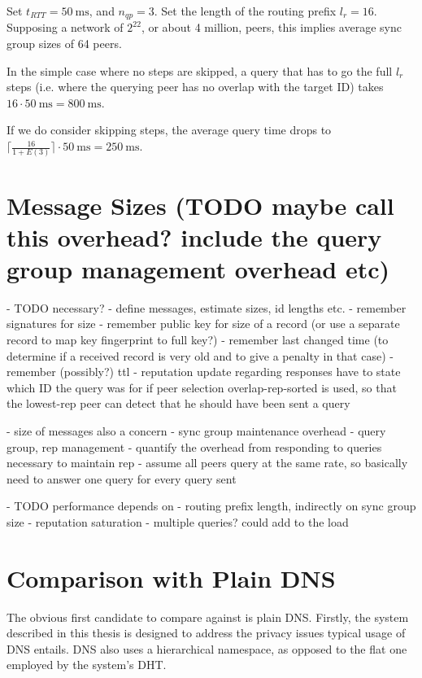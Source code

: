 Set $t_{RTT} = \SI{50}{\milli\second}$, and $n_{qp} = 3$. Set the length of the
routing prefix $l_r = 16$. Supposing a network of $2^{22}$, or about 4 million,
peers, this implies average sync group sizes of 64 peers.

In the simple case where no steps are skipped, a query that has to go the full
$l_r$ steps (i.e. where the querying peer has no overlap with the target ID)
takes $16 \cdot \SI{50}{\milli\second} = \SI{800}{\milli\second}$.

If we do consider skipping steps, the average query time drops to
$\lceil\frac{16}{1 + E(3)}\rceil \cdot \SI{50}{\milli\second} =
\SI{250}{\milli\second}$.

\section{Message Sizes (TODO maybe call this overhead? include the query group
management overhead etc)}
- TODO necessary?
- define messages, estimate sizes, id lengths etc.
    - remember signatures for size
    - remember public key for size of a record (or use a separate record to map
      key fingerprint to full key?)
    - remember last changed time (to determine if a received record is very old
      and to give a penalty in that case)
    - remember (possibly?) ttl
    - reputation update regarding responses have to state which ID the query was
      for if peer selection overlap-rep-sorted is used, so that the lowest-rep
      peer can detect that he should have been sent a query

- size of messages also a concern
- sync group maintenance overhead
- query group, rep management
- quantify the overhead from responding to queries necessary to maintain rep
    - assume all peers query at the same rate, so basically need to answer one
      query for every query sent

- TODO performance depends on
    - routing prefix length, indirectly on sync group size
    - reputation saturation
    - multiple queries? could add to the load

\section{Comparison with Plain DNS}
The obvious first candidate to compare against is plain DNS. Firstly, the system
described in this thesis is designed to address the privacy issues typical
usage of DNS entails. DNS also uses a hierarchical namespace, as opposed to the
flat one employed by the system's \ac{DHT}.


